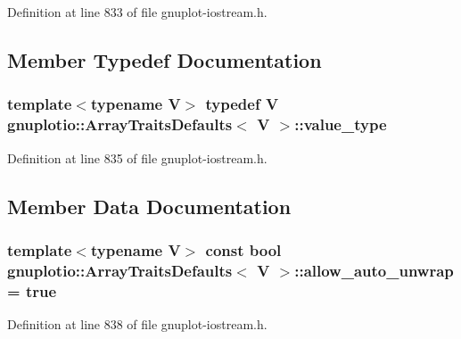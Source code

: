 Definition at line 833 of file gnuplot-\/iostream.\+h.



\subsection{Member Typedef Documentation}
\subsubsection[{\texorpdfstring{value\+\_\+type}{value_type}}]{\setlength{\rightskip}{0pt plus 5cm}template$<$typename V$>$ typedef V {\bf gnuplotio\+::\+Array\+Traits\+Defaults}$<$ V $>$\+::{\bf value\+\_\+type}}\hypertarget{classgnuplotio_1_1_array_traits_defaults_ad7a9e8d19419fabe2ab9cc1b76c9965b}{}\label{classgnuplotio_1_1_array_traits_defaults_ad7a9e8d19419fabe2ab9cc1b76c9965b}


Definition at line 835 of file gnuplot-\/iostream.\+h.



\subsection{Member Data Documentation}
\subsubsection[{\texorpdfstring{allow\+\_\+auto\+\_\+unwrap}{allow_auto_unwrap}}]{\setlength{\rightskip}{0pt plus 5cm}template$<$typename V$>$ const bool {\bf gnuplotio\+::\+Array\+Traits\+Defaults}$<$ V $>$\+::allow\+\_\+auto\+\_\+unwrap = true\hspace{0.3cm}{\ttfamily [static]}}\hypertarget{classgnuplotio_1_1_array_traits_defaults_ac8d430cba6ceefc6f52706455f12a0e8}{}\label{classgnuplotio_1_1_array_traits_defaults_ac8d430cba6ceefc6f52706455f12a0e8}


Definition at line 838 of file gnuplot-\/iostream.\+h.


